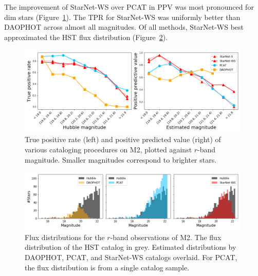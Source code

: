 

The improvement of StarNet-WS over PCAT in PPV was most pronounced for dim stars (Figure~\ref{fig:summary_stats}). The TPR for StarNet-WS was uniformly better than DAOPHOT across almost all magnitudes. 
Of all methods, StarNet-WS best approximated the HST flux distribution (Figure~\ref{fig:luminosity_fun_m2}). 


\begin{figure}[tb]
    \centering
    \includegraphics[width=0.99\textwidth]{figures/m2_results/summary_statistics_m2.png}
    \vspace{-0.4cm}
    \caption{True positive rate (left) and positive predicted value (right) of various cataloging
    procedures on M2, plotted against $r$-band magnitude.
    Smaller magnitudes correspond to brighter stars.
    }
    \label{fig:summary_stats}
\end{figure}


\begin{figure}[tb]
    \centering
    \includegraphics[width=0.99\textwidth]{figures/m2_results/luminosity_fun.png}
    \vspace{-0.4cm}
    \caption{Flux distributions for the $r$-band observations of M2. 
    The flux distribution of the HST catalog in grey. 
    Estimated distributions by DAOPHOT, PCAT, and StarNet-WS catalogs overlaid.
    For PCAT, the flux distribution is from a single catalog sample. }
    \label{fig:luminosity_fun_m2}
\end{figure}

